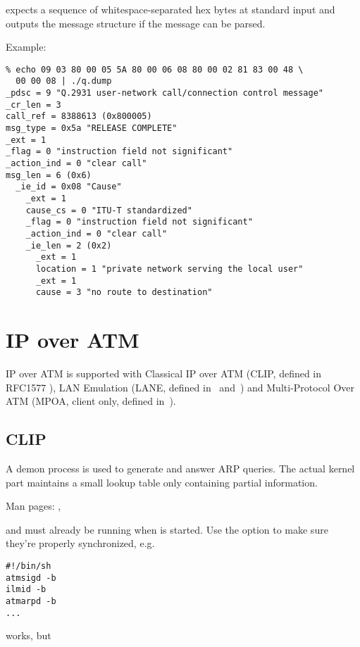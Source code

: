  expects a sequence of whitespace-separated hex bytes at standard
input and outputs the message structure if the message can be parsed.

Example:

\begin{verbatim}
% echo 09 03 80 00 05 5A 80 00 06 08 80 00 02 81 83 00 48 \
  00 00 08 | ./q.dump
_pdsc = 9 "Q.2931 user-network call/connection control message"
_cr_len = 3
call_ref = 8388613 (0x800005)
msg_type = 0x5a "RELEASE COMPLETE"
_ext = 1
_flag = 0 "instruction field not significant"
_action_ind = 0 "clear call"
msg_len = 6 (0x6)
  _ie_id = 0x08 "Cause"
    _ext = 1
    cause_cs = 0 "ITU-T standardized"
    _flag = 0 "instruction field not significant"
    _action_ind = 0 "clear call"
    _ie_len = 2 (0x2)
      _ext = 1
      location = 1 "private network serving the local user"
      _ext = 1
      cause = 3 "no route to destination"
\end{verbatim}




\section{IP over ATM}
\label{ipoveratm}

IP over ATM is supported with Classical IP over ATM (CLIP, defined in
RFC1577 \cite{RFC1577}), LAN Emulation (LANE, defined in~\cite{lanev1}
and~\cite{lanev2}) and Multi-Protocol Over ATM (MPOA, client only,
defined in~\cite{mpoav1}).


\subsection{CLIP}
\label{clip}

A demon process is used to generate and answer ARP queries.
The actual kernel part maintains a small lookup table only containing partial
information.

Man pages: , 

 and  must already be running when  is
started. Use the  option to make sure they're properly synchronized,
e.g.

\begin{verbatim}
#!/bin/sh
atmsigd -b
ilmid -b
atmarpd -b
...
\end{verbatim}

works, but

